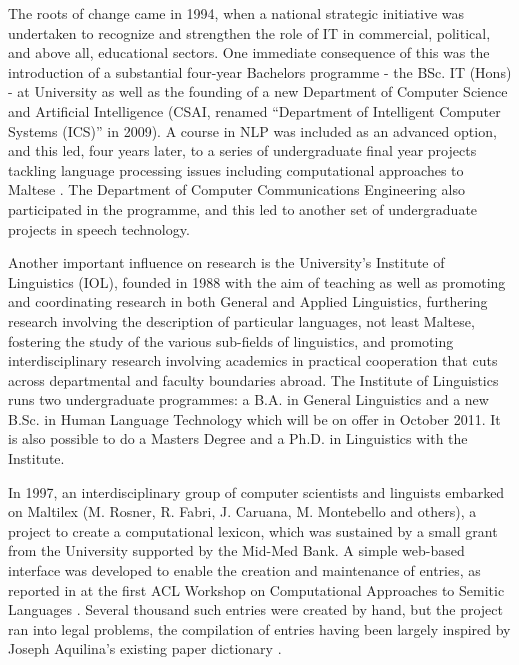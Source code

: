 \documentclass[]{../../metanetpaper}
\begin{document}
\begin{multicols}{2}
The roots of change came in 1994, when a national strategic initiative was undertaken to recognize and strengthen the role of IT in commercial, political, and above all, educational sectors. One immediate consequence of this was the introduction of a substantial four-year Bachelors programme - the BSc. IT (Hons) - at University as well as the founding of a new Department of Computer Science and Artificial Intelligence (CSAI, renamed ``Department of Intelligent Computer Systems (ICS)'' in 2009). A course in NLP was included as an advanced option, and this led, four years later, to a series of undergraduate final year projects tackling language processing issues including computational approaches to Maltese \cite{Galea:1999, Mangion:1999, Farrugia:1999, Farrugia:2000, Mizzi:2000, Bajada:2004, Attard:2005, Farrugia:2008, Farrugia:2009, Vella:2010}. The Department of Computer Communications Engineering also participated in the programme, and this led to another set of undergraduate projects in speech technology.

Another important influence on research is the University’s Institute of Linguistics (IOL), founded in 1988 with the aim of teaching as well as promoting and coordinating research in both General and Applied Linguistics, furthering research involving the description of particular languages, not least Maltese, fostering the study of the various sub-fields of linguistics, and promoting interdisciplinary research involving academics in practical cooperation that cuts across departmental and faculty boundaries abroad. The Institute of Linguistics runs two undergraduate programmes: a B.A. in General Linguistics and a new B.Sc. in Human Language Technology which will be on offer in October 2011. It is also possible to do a Masters Degree and a Ph.D. in Linguistics with the Institute.

In 1997, an interdisciplinary group of computer scientists and linguists  embarked on Maltilex (M. Rosner, R. Fabri, J. Caruana, M. Montebello and others), a project to create a computational lexicon, which was sustained by a small grant from the University supported by the Mid-Med Bank. A simple web-based interface was developed to enable the creation and maintenance of entries, as reported in \cite{Rosner-et-al:1998} at the first ACL Workshop on Computational Approaches to Semitic Languages \cite{Rosner:1998}. Several thousand such entries were created by hand, but the project ran into legal problems, the compilation of entries having been largely inspired by Joseph Aquilina's existing paper dictionary \cite{Aquilina:1987}.


\end{multicols}
\end{document}
